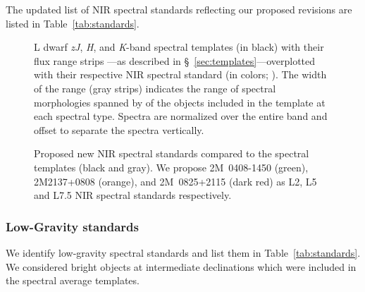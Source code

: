 \documentclass[12pt]{aastex6}
\begin{document}
The updated list of NIR spectral standards reflecting our proposed revisions are listed in Table~\ref{tab:standards}.

\begin{figure}[hb!]
        \caption{L dwarf \emph{zJ}, \emph{H}, and \emph{K}-band spectral templates (in black) with their flux range strips ---as described in \S~\ref{sec:templates}---overplotted with their respective NIR spectral standard (in colors; \cite{Kirkpatrick10}).
    The width of the range (gray strips) indicates the range of spectral morphologies spanned by of the objects included in the template at each spectral type.
    Spectra are normalized over the entire band and offset to separate the spectra vertically.}
    \label{fig:templates-stds}
\end{figure}


\begin{figure}
        \caption{Proposed new NIR spectral standards compared to the spectral templates (black and gray).
        We propose 2M~0408-1450 (green), 2M2137+0808 (orange), and 2M~0825+2115 (dark red) as L2, L5 and L7.5 NIR spectral standards respectively.}
    \label{fig:templates-newstds}
\end{figure}
\clearpage

\subsubsection{Low-Gravity standards}

We identify low-gravity spectral standards and list them in Table~\ref{tab:standards}.
We considered bright objects at intermediate declinations which were included in the spectral average templates.
\end{document}
